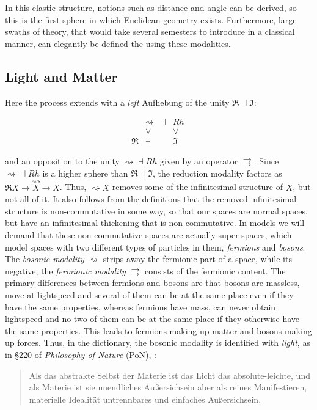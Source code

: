 \documentclass{article}
\begin{document}
In this elastic structure, notions such as distance and angle can be derived, so this is the first sphere in
which Euclidean geometry exists. Furthermore, large swaths of theory, that would take several semesters to
introduce in a classical manner, can elegantly be defined the using these modalities.



\subsection{Light and Matter}
Here the process extends with a \emph{left} Aufhebung of the unity $\Re\dashv\Im$: 


$$
  \begin{array}{cccc}
     & \rightsquigarrow & \dashv & Rh
    \\
     & \vee & & \vee
    \\
    \Re & \dashv & & \Im
    \end{array}
  \ 
$$

and an opposition to the unity $\rightsquigarrow\dashv Rh$ given by an operator $\rightrightarrows$. Since
$\rightsquigarrow\dashv Rh$ is a higher sphere than $\Re\dashv\Im$, the reduction modality factors as $\Re
X\rightarrow\overset{\rightsquigarrow }{X}\rightarrow X$. Thus, $\rightsquigarrow X$ removes some of the
infinitesimal structure of $X$, but not all of it. It also follows from the definitions that the removed
infinitesimal structure is non-commutative in some way, so that our spaces are normal spaces, but have an
infinitesimal thickening that is non-commutative. In models we will demand that these non-commutative spaces
are actually super-spaces, which model spaces with two different types of particles in them, \emph{fermions}
and \emph{bosons}. The \emph{bosonic modality} $\rightsquigarrow$ strips away the fermionic part of a space,
while its negative, the \emph{fermionic modality} $\rightrightarrows$ consists of the fermionic content. The
primary differences between fermions and bosons are that bosons are massless, move at lightspeed and several
of them can be at the same place even if they have the same properties, whereas fermions have mass, can never
obtain lightspeed and no two of them can be at the same place if they otherwise have the same properties.
This leads to fermions making up matter and bosons making up forces. Thus, in the dictionary, the bosonic
modality is identified with \emph{light}, as in §220 of \emph{Philosophy of Nature} (PoN), \cite{EoS}:

\begin{quote}
    Als das abstrakte Selbst der Materie ist das Licht das absolute-leichte, und als Materie ist sie unendliches Außersichsein aber als reines Manifestieren, materielle Idealität untrennbares und einfaches Außersichsein.
\end{quote}
\end{document}
